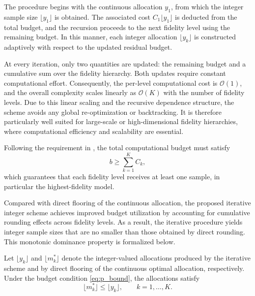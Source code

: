 The procedure begins with the continuous allocation $y_1$, from which the integer sample size $\lfloor y_1 \rfloor$ is obtained. The associated cost $C_1 \lfloor y_1 \rfloor$ is deducted from the total budget, and the recursion proceeds to the next fidelity level using the remaining budget. In this manner, each integer allocation $\lfloor y_k \rfloor$ is constructed adaptively with respect to the updated residual budget.

At every iteration, only two quantities are updated: the remaining budget and a cumulative sum over the fidelity hierarchy. Both updates require constant computational effort. Consequently, the per-level computational cost is $\mathcal{O}(1)$, and the overall complexity scales linearly as $\mathcal{O}(K)$ with the number of fidelity levels. Due to this linear scaling and the recursive dependence structure, the scheme avoids any global re-optimization or backtracking. It is therefore particularly well suited for large-scale or high-dimensional fidelity hierarchies, where computational efficiency and scalability are essential.

Following the requirement in \cite{GrGuJuWa:2023}, the total computational budget must satisfy
%
\begin{equation}\label{eq:p_bound}
    b \ge \sum_{k=1}^K C_k,
\end{equation}
%
which guarantees that each fidelity level receives at least one sample, in particular the highest-fidelity model.

Compared with direct flooring of the continuous allocation, the proposed iterative integer scheme achieves improved budget utilization by accounting for cumulative rounding effects across fidelity levels. As a result, the iterative procedure yields integer sample sizes that are no smaller than those obtained by direct rounding. This monotonic dominance property is formalized below.

\begin{corollary}
\label{thm:MFMC_New_IntegerValued_Cost}
Let $\lfloor y_k \rfloor$ and $\lfloor m_k^* \rfloor$ denote the integer-valued allocations produced by the iterative scheme and by direct flooring of the continuous optimal allocation, respectively. Under the budget condition \eqref{eq:p_bound}, the allocations satisfy
\[
\lfloor m_k^* \rfloor \le \lfloor y_k \rfloor,
\qquad k=1,\ldots,K.
\]
\end{corollary}
%

